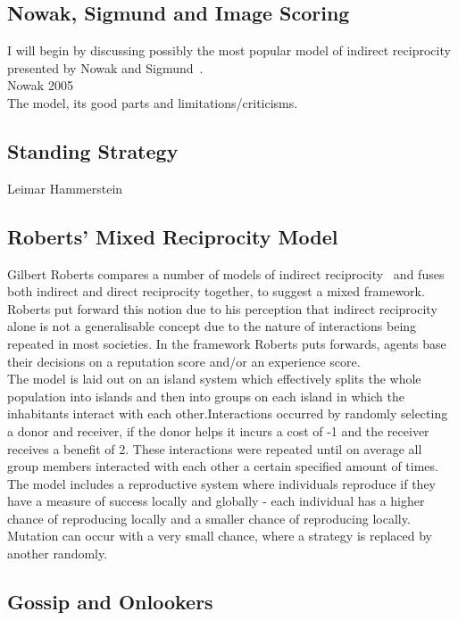 \documentclass[twoside,twocolumn]{article}
\begin{document}
\subsection{Nowak, Sigmund and Image Scoring}
I will begin by discussing possibly the most popular model of indirect reciprocity presented by Nowak and Sigmund~\cite{evol_indirect_image}.\\
Nowak 2005\\
The model, its good parts and limitations/criticisms.

\subsection{Standing Strategy}
Leimar Hammerstein\\


\subsection{Roberts' Mixed Reciprocity Model}
Gilbert Roberts compares a number of models of indirect reciprocity~\cite{evoldirindir} and fuses both indirect and direct reciprocity together, to suggest a mixed framework. Roberts put forward this notion due to his perception that indirect reciprocity alone is not a generalisable concept due to the nature of interactions being repeated in most societies. In the framework Roberts puts forwards, agents base their decisions on a reputation score and/or an experience score.\\
The model is laid out on an island system which effectively splits the whole population into islands and then into groups on each island in which the inhabitants interact with each other.Interactions occurred by randomly selecting a donor and receiver, if the donor helps it incurs a cost of -1 and the receiver receives a benefit of 2. These interactions were repeated until on average all group members interacted with each other a certain specified amount of times.\\
The model includes a reproductive system where individuals reproduce if they have a measure of success locally and globally - each individual has a higher chance of reproducing locally and a smaller chance of reproducing locally. Mutation can occur with a very small chance, where a strategy is replaced by another randomly.\\


\subsection{Gossip and Onlookers}
~\cite{gossip_alt}\\
\end{document}
